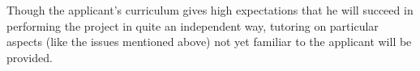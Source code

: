 Though the applicant's curriculum gives high expectations that  he will succeed in performing the project 
in quite an independent way, tutoring on particular aspects (like the issues mentioned above) not yet 
familiar to the applicant will be provided.
\newpage


